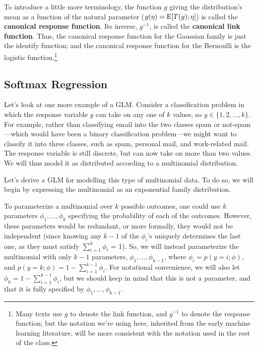 \documentclass{article}
\begin{document}
To introduce a little more terminology, the function $g$ giving the distribution's mean as
a function of the natural parameter ($g(\eta) = {\rm E}[T(y);\eta]$) is called
the {\bf canonical response function}.  Its inverse, $g^{-1}$, is called
the {\bf canonical link function}.  Thus, the canonical response function
for the Gaussian family is just the identify function; and the canonical
response function for the Bernoulli is the logistic function.\footnote{Many
texts use $g$ to denote the link function, and $g^{-1}$ to denote the response
function; but the notation we're using here, inherited from the early machine
learning literature, will be more consistent with the notation used in the
rest of the class.}

\subsection{Softmax Regression}

Let's look at one more example of a GLM.  Consider a classification problem in which
the response variable $y$ can take on any one of $k$ values,
so $y \in \{1, 2, \ldots, k\}$.  For example, rather than classifying email into
the two classes spam or not-spam---which would have been a binary
classification problem---we might want to classify it into three classes,
such as spam, personal mail, and work-related mail.  The response variable is
still discrete, but can now take on more than two values.  We will
thus model it as distributed according to a multinomial distribution.

Let's derive a GLM for modelling this type of multinomial data.  To do so, we will
begin by expressing the multinomial as an exponential family distribution.

To parameterize a multinomial over $k$ possible outcomes, one could use $k$ parameters
$\phi_1, \ldots, \phi_k$ specifying the probability of each of the outcomes.  However,
these parameters would be redundant, or more formally, they would not be
independent (since knowing any $k-1$ of the $\phi_i$'s uniquely determines
the last one, as they must satisfy $\sum_{i=1}^k \phi_i$ = 1).  So, we will
instead parameterize the multinomial with only $k-1$ parameters,
$\phi_1, \ldots, \phi_{k-1}$, where $\phi_i = p(y=i;\phi)$, and
$p(y=k;\phi)=1-\sum_{i=1}^{k-1} \phi_i$.  For notational convenience, we
will also let $\phi_k = 1-\sum_{i=1}^{k-1} \phi_i$, but we should keep in mind that this
is not a parameter, and that it is fully specified by $\phi_1, \ldots, \phi_{k-1}$.
\end{document}

